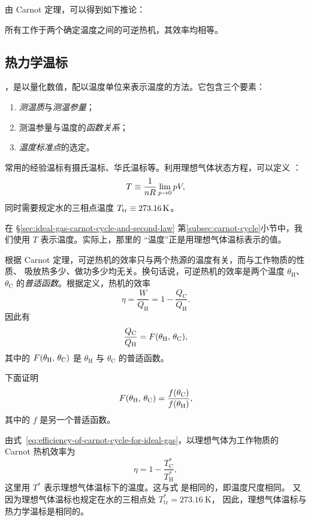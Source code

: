 由 Carnot 定理，可以得到如下推论：

\begin{theorem}
  所有工作于两个确定温度之间的可逆热机，其效率均相等。
\end{theorem}

\subsection{热力学温标}

，是以量化数值，配以温度单位来表示温度的方法。它包含三个要素：
\begin{enumerate}
  \item \emph{测温质}与\emph{测温参量}；
  \item 测温参量与温度的\emph{函数关系}；
  \item \emph{温度标准点}的选定。
\end{enumerate}

常用的经验温标有摄氏温标、华氏温标等。利用理想气体状态方程，可以定义%
：
\begin{equation}
  T \equiv \frac{1}{nR} \lim_{p \to 0} pV,
\end{equation}
同时需要规定水的三相点温度 $T_\text{tr} \equiv \SI{273.16}{\kelvin}$。

在 \S\ref{sec:ideal-gas-carnot-cycle-and-second-law}
第\ref{subsec:carnot-cycle}小节中，我们使用 $T$ 表示温度。实际上，那里的
“温度”正是用理想气体温标表示的值。

根据 Carnot 定理，可逆热机的效率只与两个热源的温度有关，而与工作物质的性质、
吸放热多少、做功多少均无关。换句话说，可逆热机的效率是两个温度
$\theta_\text{H}$、$\theta_\text{C}$ 的\emph{普适函数}。根据定义，热机的效率
\begin{equation}
  \eta = \frac{W}{Q_\text{H}} = 1 - \frac{Q_\text{C}}{Q_\text{H}}.
\end{equation}
因此有
\begin{equation}
  \frac{Q_\text{C}}{Q_\text{H}} = F\qty(\theta_\text{H}, \, \theta_\text{C}),
\end{equation}
其中的 $F\qty(\theta_\text{H}, \, \theta_\text{C})$ 是 $\theta_\text{H}$ 与
$\theta_\text{C}$ 的普适函数。

下面证明
\begin{equation}
  F(\theta_\text{H}, \, \theta_\text{C})
  = \frac{f\qty(\theta_\text{C})}{f(\theta_\text{H})},
\end{equation}
其中的 $f$ 是另一个普适函数。%

由式~\eqref{eq:efficiency-of-carnot-cycle-for-ideal-gas}，以理想气体为工作物质的
Carnot 热机效率为
\begin{equation}
  \eta = 1 - \frac{T^*_\text{C}}{T^*_\text{H}},
\end{equation}
这里用 $T^*$ 表示理想气体温标下的温度。这与式 是相同的，即温度尺度相同。
又因为理想气体温标也规定在水的三相点处 $T^*_\text{tr} = \SI{273.16}{\kelvin}$，
因此，理想气体温标与热力学温标是相同的。

